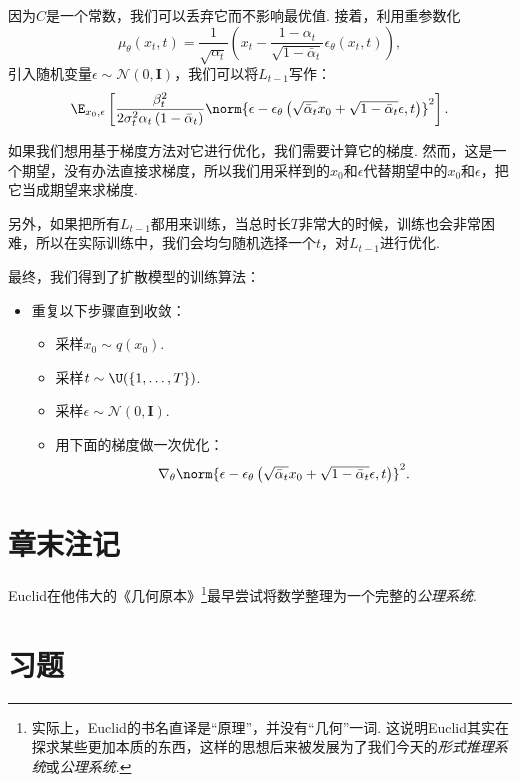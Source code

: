 因为$C$是一个常数，我们可以丢弃它而不影响最优值. 接着，利用重参数化
\[
\mu_{\theta}(x_t, t) =  \frac{1}{\sqrt{\alpha_t}} \left( x_t - \frac{1-\alpha_t}{\sqrt{1 - \bar{\alpha}_t}}\epsilon_{\theta}(x_t, t) \right),
\]
引入随机变量$\epsilon\sim\mathcal{N}(0,\mathbf{I})$，我们可以将$L_{t-1}$写作：
\[
\E_{x_0, \epsilon}\left[\frac{\beta_t^2}{2 \sigma_t^2 \alpha_t\left(1-\bar{\alpha}_t\right)}\norm{\epsilon-\epsilon_\theta\left(\sqrt{\bar{\alpha}_t} x_0+\sqrt{1-\bar{\alpha}_t} \epsilon, t\right)}^2\right].
\]

如果我们想用基于梯度方法对它进行优化，我们需要计算它的梯度. 然而，这是一个期望，没有办法直接求梯度，所以我们用采样到的$x_0$和$\epsilon$代替期望中的$x_0$和$\epsilon$，把它当成期望来求梯度. 

另外，如果把所有$L_{t-1}$都用来训练，当总时长$T$非常大的时候，训练也会非常困难，所以在实际训练中，我们会均匀随机选择一个$t$，对$L_{t-1}$进行优化. 

最终，我们得到了扩散模型的训练算法：

\begin{itemize}
    \item 重复以下步骤直到收敛：
    \begin{itemize}
        \item 采样$x_0 \sim q\left(x_0\right)$.
        \item 采样$t \sim \U(\{1, \ldots, T\})$.
        \item 采样$\epsilon \sim \mathcal{N}(0, \mathbf{I})$.
        \item 用下面的梯度做一次优化：
        \[
        \nabla_\theta\norm{\epsilon-\epsilon_\theta\left(\sqrt{\bar{\alpha}_t} x_0+\sqrt{1-\bar{\alpha}_t} \epsilon, t\right)}^2.
        \]
    \end{itemize}
\end{itemize}


\section{章末注记} 

Euclid在他伟大的《几何原本》\footnote{实际上，Euclid的书名直译是“原理”，并没有“几何”一词. 这说明Euclid其实在探求某些更加本质的东西，这样的思想后来被发展为了我们今天的\emph{形式推理系统}或\emph{公理系统}.}最早尝试将数学整理为一个完整的\emph{公理系统}. 

\section{习题} 